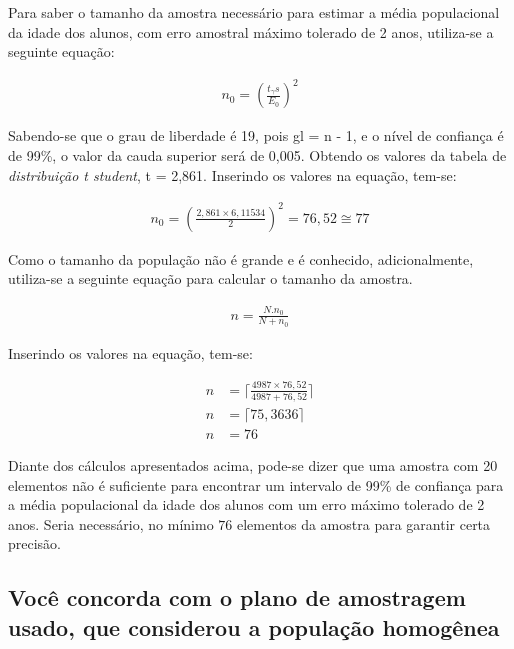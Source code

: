 	Para saber o tamanho da amostra necessário para estimar a média
	populacional da idade dos alunos, com erro amostral máximo tolerado de 2
	anos, utiliza-se a seguinte equação:

	\begin{align}
		\label{eq:dois-b-expr1}
		 n_0 = \left (\frac{t_\gamma s}{E_0} \right)^2
	\end{align}

	Sabendo-se que o grau de liberdade é 19, pois gl = n - 1, e o nível de
	confiança é de 99\%, o valor da cauda superior será de 0,005. Obtendo os
	valores da tabela de \textit{distribuição t student}, t = 2,861.
	Inserindo os valores na equação, tem-se:

	\begin{align*}
		n_0 = \left (\frac{2,861 \times 6,11534}{2} \right)^2 = 76,52 \cong 77
	\end{align*}

	Como o tamanho da população não é grande e é conhecido, adicionalmente,
	utiliza-se a seguinte equação para calcular o tamanho da amostra.

	\begin{align}
		\label{eq:dois-b-expr2}
		n = \frac{N . n_0}{N + n_0}
	\end{align}

	Inserindo os valores na equação, tem-se:

	\begin{align*}
		n &= \lceil \frac{4987 \times 76,52}{4987 + 76,52} \rceil \\
		n &= \lceil 75,3636 \rceil \\
		n &= 76
	\end{align*}

	Diante dos cálculos apresentados acima, pode-se dizer que uma amostra
	com 20 elementos não é suficiente para encontrar um intervalo de 99\% de
	confiança para a média populacional da idade dos alunos com um erro
	máximo tolerado de 2 anos. Seria necessário, no mínimo $76$ elementos da
	amostra para garantir certa precisão.

\subsection{Você concorda com o plano de amostragem usado, que considerou a população homogênea}

